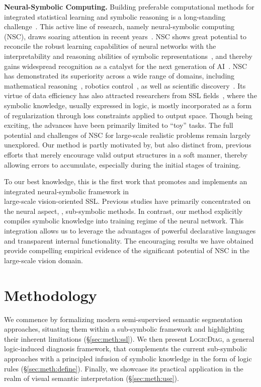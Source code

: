 \documentclass[10pt,twocolumn,letterpaper]{article}
\def\Ours{{\textsc{LogicDiag}}}
\begin{document}
\noindent\textbf{Neural-Symbolic Computing.}
Building preferable computational methods for integrated statistical learning and symbolic reasoning is a long-standing challenge~\cite{mcculloch1943logical}.
This active line of research, namely neural-symbolic computing (NSC),
draws soaring attention in recent years~\cite{giunchiglia2021multi,teru2020inductive,lin2019kagnet,rocktaschel2017end}. NSC shows great potential to reconcile the robust learning capabilities of neural networks with the interpretability and reasoning abilities of symbolic representations~\cite{garcez2022neural,wang2022towards}, and thereby gains widespread recognition as a catalyst for the next generation of AI~\cite{lake2017building,marcus2018deep}.
NSC has demonstrated its superiority across a wide range of domains, including mathematical reasoning~\cite{lample2019deep,li2020closed,arabshahi2018combining}, robotics control~\cite{sun2021neuro,silver2022learning,zhu2021hierarchical}, as well as scientific discovery~\cite{cranmer2020discovering,jumper2021highly,shah2020learning,tseng2022automatic}.
Its virtue of data efficiency has also attracted researchers from SSL fields~\cite{marra2020integrating,van2019semi,xu2018semantic,tsamoura2021neural}, where the symbolic knowledge, usually expressed in logic, is mostly incorporated as a form of regularization through loss constraints applied to output space.
Though being exciting, the advances have been primarily limited to ``toy'' tasks.
The full potential and challenges of NSC for large-scale realistic problems remain largely unexplored.
Our method is partly motivated by, but also distinct from, previous efforts that merely encourage valid output structures in a soft manner, thereby allowing errors to accumulate, especially during the initial stages of training.

To our best knowledge, this is the first work that promotes and implements an integrated neural-symbolic framework in\\ large-scale vision-oriented SSL.
Previous studies have primarily concentrated on the neural aspect, \ie, sub-symbolic methods.
In contrast, our method explicitly compiles symbolic knowledge into training regime of the neural network. This integration allows us to leverage the advantages of powerful declarative languages and transparent internal functionality.
The encouraging results we have obtained provide compelling empirical evidence of the significant potential of NSC in the large-scale vision domain.

\vfill
\section{Methodology}\label{sec:method}
We commence by formalizing modern semi-supervised semantic segmentation approaches, situating them within a sub-symbolic framework and highlighting their inherent limitations (\S\ref{sec:meth:ssl}).
We then present {\Ours}, a general logic-induced diagnosis framework, that complements the current sub-symbolic approaches with a principled infusion of symbolic knowledge in the form of logic rules (\S\ref{sec:meth:define}).
Finally, we showcase its practical application in the realm of visual semantic interpretation (\S\ref{sec:meth:use}).
\end{document}
